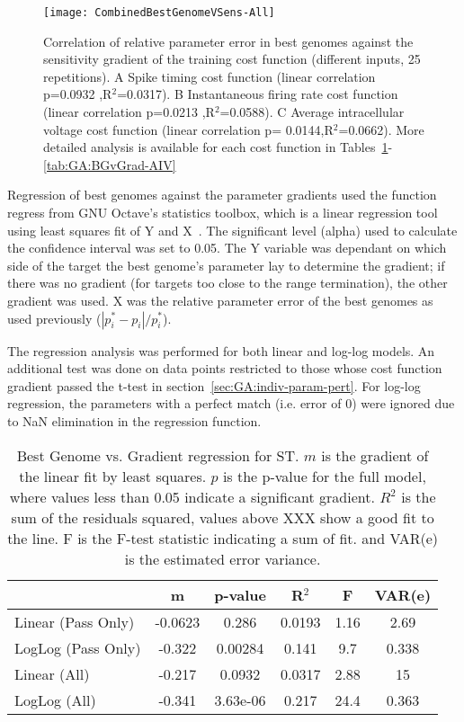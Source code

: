 \begin{figure}[th]
  \centering
  \texttt{[image: CombinedBestGenomeVSens-All]}  
  \caption{Correlation of relative parameter error in {\GA} best genomes
    against the sensitivity gradient of the training cost function
    (different {\ANF} inputs, 25 repetitions). A Spike timing cost
    function (linear correlation p=0.0932 ,R$^2$=0.0317). B
    Instantaneous firing rate cost function (linear correlation
    p=0.0213 ,R$^2$=0.0588).  C Average intracellular voltage cost
    function (linear correlation p= 0.0144,R$^2$=0.0662).  More
    detailed analysis is available for each cost function in
    Tables~\ref{tab:GA:BGvGrad-ST}-\ref{tab:GA:BGvGrad-AIV}}
  \label{fig:GA:BestGenomeVGradient}
\end{figure}
% 

Regression of best genomes against the parameter gradients used the
function \textsf{regress} from GNU Octave's \textsf{statistics}
toolbox, which is a linear regression tool using least squares fit of
Y and X~\citep{Eaton:2002}. The significant level (alpha) used to
calculate the confidence interval was set to 0.05. The Y variable was
dependant on which side of the target the best genome's parameter lay
to determine the gradient; if there was no gradient (for targets too
close to the range termination), the other gradient was used. X was
the relative parameter error of the best genomes as used previously
($\left|p^\ast_i-{p}_i\right|/p^\ast_i$).

\smallskip{}

The regression analysis was performed for both linear and log-log
models. An additional test was done on data points restricted to those
whose cost function gradient passed the t-test in
section~\ref{sec:GA:indiv-param-pert}. For log-log regression, the
parameters with a perfect match (i.e. error of 0) were ignored due to
NaN elimination in the regression function.

\smallskip{}

\begin{table}[th]
  \centering
  \begin{tabular}{lccccc}
\toprule
                   &    m    & p-value  & R$^2$ &  F  & VAR(e) \\[1ex] \midrule
Linear (Pass Only) & -0.0623 &  0.286   & 0.0193& 1.16& 2.69   \\
LogLog (Pass Only) & -0.322  & 0.00284  & 0.141 & 9.7 & 0.338 \\[0.5ex] \hline
   Linear (All)    & -0.217  &  0.0932  & 0.0317& 2.88& 15     \\
   LogLog (All)    & -0.341  & 3.63e-06 & 0.217 & 24.4& 0.363 \\[1ex] \hline    
 \end{tabular}
 \caption{Best Genome vs. Gradient regression for ST. $m$ is the gradient of the    linear fit by least squares. $p$ is the p-value for the full model, where values  less than 0.05 indicate a significant gradient. $R^2$ is the sum of the residuals  squared, values above XXX show a good fit to the line.  F is the F-test statistic  indicating a sum of fit.  and VAR(e) is the estimated error variance.  }
  \label{tab:GA:BGvGrad-ST}
\end{table}


